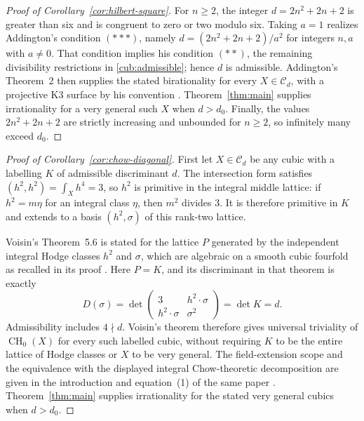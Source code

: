 \begin{proof}[Proof of Corollary~\ref{cor:hilbert-square}]
For \(n\ge2\), the integer \(d=2n^2+2n+2\) is greater than six and is
congruent to zero or two modulo six. Taking \(a=1\) realizes Addington's
condition \((***)\), namely
\(d=(2n^2+2n+2)/a^2\) for integers \(n,a\) with \(a\ne0\).
That condition implies his condition \((**)\), the remaining divisibility
restrictions in \eqref{cub:admissible}; hence \(d\) is admissible.
Addington's Theorem~2 then supplies the stated birationality for every
\(X\in\mathcal C_d\), with a projective K3 surface by his convention
\cite[condition~\((***)\), Theorem~2, and the convention in the introduction]{Addington16}.
Theorem~\ref{thm:main} supplies irrationality for a very general such
\(X\) when \(d>d_0\). Finally, the values \(2n^2+2n+2\) are strictly
increasing and unbounded for \(n\ge2\), so infinitely many exceed \(d_0\).
\end{proof}

\begin{proof}[Proof of Corollary~\ref{cor:chow-diagonal}]
First let \(X\in\mathcal C_d\) be any cubic with a labelling \(K\) of
admissible discriminant \(d\). The intersection form satisfies
\((h^2,h^2)=\int_Xh^4=3\), so \(h^2\) is primitive in the integral middle
lattice: if \(h^2=m\eta\) for an integral class \(\eta\), then \(m^2\)
divides \(3\). It is therefore primitive in \(K\) and extends to a basis
\((h^2,\sigma)\) of this rank-two lattice.

Voisin's Theorem~5.6 is stated for the lattice \(P\) generated by the
independent integral Hodge classes \(h^2\) and \(\sigma\), which are
algebraic on a smooth cubic fourfold as recalled in its proof
\cite[Theorem~5.6 and its proof]{Voisin17}. Here \(P=K\), and its
discriminant in that theorem is exactly
\[
 D(\sigma)=
 \det\begin{pmatrix}
  3 & h^2\mathbin{\cdot}\sigma\\
  h^2\mathbin{\cdot}\sigma & \sigma^2
 \end{pmatrix}
 =\det K=d.
\]
Admissibility includes \(4\nmid d\). Voisin's theorem therefore gives
universal triviality of \(\operatorname{CH}_0(X)\) for every such labelled
cubic, without requiring \(K\) to be the entire lattice of Hodge classes
or \(X\) to be very general. The field-extension scope and the equivalence
with the displayed integral Chow-theoretic decomposition are given in the
introduction and equation~(1) of the same paper \cite{Voisin17}.
Theorem~\ref{thm:main} supplies irrationality for the stated very general
cubics when \(d>d_0\).
\end{proof}
